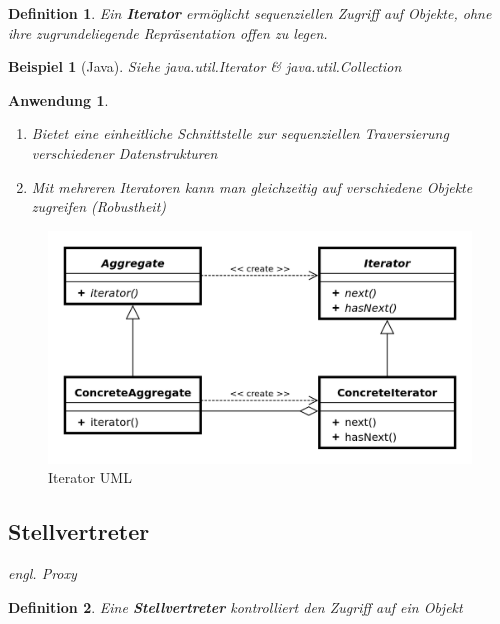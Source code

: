 \documentclass[a4paper]{article}
\theoremstyle{break}
\newtheorem{defi}{Definition}[section]
\newtheorem{ex}{Beispiel}[section]
\newtheorem{why}{Anwendung}[section]
\begin{document}
\begin{defi}
	Ein \textbf{Iterator} ermöglicht sequenziellen Zugriff auf Objekte, ohne ihre zugrundeliegende Repräsentation offen zu legen.
\end{defi}
\begin{ex}[Java]
	Siehe java.util.Iterator \& java.util.Collection
\end{ex}
\begin{why}
	\begin{enumerate}
		\item Bietet eine einheitliche Schnittstelle zur sequenziellen Traversierung verschiedener Datenstrukturen
		\item Mit mehreren Iteratoren kann man gleichzeitig auf verschiedene Objekte zugreifen (Robustheit)
	\end{enumerate}
\end{why}
\begin{figure}[H]
	\centering
	\includegraphics[width=\textwidth]{../diagrams/uml/IteratorPattern.png}
	\caption{Iterator UML}
\end{figure}

\newpage
\subsection{Stellvertreter}
\textit{engl. Proxy}
\begin{defi}
	Eine \textbf{Stellvertreter} kontrolliert den Zugriff auf ein Objekt
\end{defi}
\end{document}
